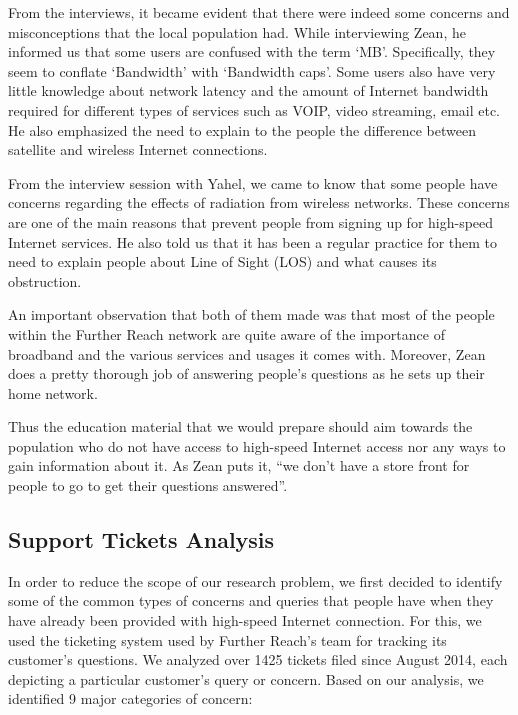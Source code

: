 From the interviews, it became evident that there were indeed some concerns
and misconceptions that the local population had. While interviewing Zean, he
informed us that some users are confused with the term `MB'. Specifically,
they seem to conflate `Bandwidth' with `Bandwidth caps'. Some users also have
very little knowledge about network latency and the amount of Internet
bandwidth required for different types of services such as VOIP, video streaming, email etc. He also emphasized the need to explain to the people the difference between satellite and wireless Internet connections.

From the interview session with Yahel, we came to know that some people have
concerns regarding the effects of radiation from wireless networks. These
concerns are one of the main reasons that prevent people from signing up for
high-speed Internet services. He also told us that it has been a regular
practice for them to need to explain people about Line of Sight (LOS) and what causes its obstruction.

An important observation that both of them made was that most of the people
within the Further Reach network are quite aware of the importance of
broadband and the various services and usages it comes with. Moreover, Zean
does a pretty thorough job of answering people's questions as he sets up their
home network.

Thus the education material that we would prepare should aim towards the
population who do not have access to high-speed Internet access nor any ways
to gain information about it. As Zean puts it, ``we don't have a store
front for people to go to get their questions answered''.

\subsection{Support Tickets Analysis}
\label{sec:supp-tick-analys}

In order to reduce the scope of our research problem, we first decided to identify some of the common types of concerns and queries that people have when they have already been provided with high-speed Internet connection. For this, we used the ticketing system used by Further Reach’s team for tracking its customer’s questions. We analyzed over 1425 tickets filed since August 2014, each depicting a particular customer’s query or concern. Based on our analysis, we identified 9 major categories of concern:


